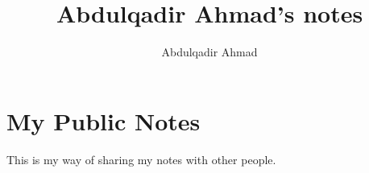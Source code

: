 \documentclass{article}
\title{Abdulqadir Ahmad's notes}
\author{Abdulqadir Ahmad}
\begin{document}
\maketitle
\section*{My Public Notes}
This is my way of sharing my notes with other people.

\end{document}
